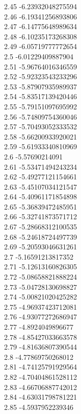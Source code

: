 {2.45	-6.23932048275594\\
2.46	-6.19341256893806\\
2.47	-6.14775648989634\\
2.48	-6.10235173268308\\
2.49	-6.05719777772654\\
2.5	-6.01229409887904\\
2.51	-5.96764016346559\\
2.52	-5.92323543233296\\
2.53	-5.87907935989937\\
2.54	-5.83517139420446\\
2.55	-5.79151097695992\\
2.56	-5.74809754360046\\
2.57	-5.70493052333532\\
2.58	-5.66200933920021\\
2.59	-5.61933340810969\\
2.6	-5.57690214091\\
2.61	-5.53471494243234\\
2.62	-5.49277121154661\\
2.63	-5.45107034121547\\
2.64	-5.40961171854898\\
2.65	-5.36839472485951\\
2.66	-5.32741873571712\\
2.67	-5.28668312100535\\
2.68	-5.24618724497739\\
2.69	-5.20593046631261\\
2.7	-5.16591213817352\\
2.71	-5.12613160826305\\
2.72	-5.08658821888224\\
2.73	-5.04728130698827\\
2.74	-5.00821020425282\\
2.75	-4.96937423712081\\
2.76	-4.93077272686947\\
2.77	-4.8924049896677\\
2.78	-4.85427033663578\\
2.79	-4.81636807390544\\
2.8	-4.77869750268012\\
2.81	-4.74125791929564\\
2.82	-4.70404861528112\\
2.83	-4.66706887742012\\
2.84	-4.63031798781221\\
2.85	-4.5937952239346\\
}
